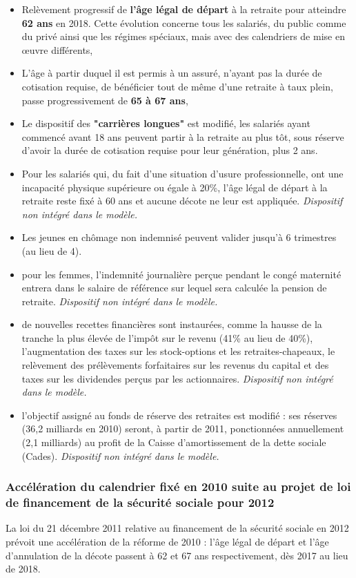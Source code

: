 \begin{itemize}
	\item  Relèvement progressif de \textbf{l'âge légal de départ} à 
la retraite pour atteindre \textbf{62 ans} en 2018. Cette évolution 
concerne tous les salariés, du public comme du privé ainsi 
que les régimes spéciaux, mais avec des calendriers de mise 
en œuvre différents,
	\item   L'âge à partir duquel il est permis à un assuré, 
n'ayant pas la durée de cotisation requise, de bénéficier 
tout de même d'une retraite à taux plein, passe 
progressivement de \textbf{65 à 67 ans},
	\item   Le dispositif des \textbf{"carrières longues"} est modifié, 
les salariés ayant commencé avant 18 ans peuvent partir à la 
retraite au plus tôt, sous réserve d'avoir la durée de 
cotisation requise pour leur génération, plus 2 ans.
	\item   Pour les salariés qui, du fait d'une situation 
d'usure professionnelle, ont une incapacité physique 
supérieure ou égale à 20\%, l'âge légal de départ à la 
retraite reste fixé à 60 ans et aucune décote ne leur est 
appliquée. \textit{Dispositif non intégré dans le modèle.}
	\item   Les jeunes en chômage non indemnisé peuvent 
valider jusqu'à 6 trimestres (au lieu de 4).
	 \item    pour les femmes, l'indemnité journalière perçue 
 pendant le congé maternité entrera dans le salaire de 
 référence sur lequel sera calculée la pension de retraite. \textit{Dispositif non intégré dans le modèle.}
	 \item    de nouvelles recettes financières sont instaurées, 
 comme la hausse de la tranche la plus élevée de l'impôt sur 
 le revenu (41\% au lieu de 40\%), l'augmentation des 
 taxes sur les stock-options et les retraites-chapeaux, le 
 relèvement des prélèvements forfaitaires sur les revenus du 
 capital et des taxes sur les dividendes perçus par les 
 actionnaires. \textit{Dispositif non intégré dans le modèle.}
	 \item    l'objectif assigné au fonds de réserve des 
 retraites est modifié : ses réserves (36,2 milliards en 2010)
  seront, à partir de 2011, ponctionnées annuellement (2,1 
 milliards) au profit de la Caisse d'amortissement de la 
 dette sociale (Cades). \textit{Dispositif non intégré dans le modèle.}
\end{itemize}

\subsubsection{Accélération du calendrier fixé en 2010 suite au projet de loi de financement de la sécurité sociale pour 2012}
La loi du 21 décembre 2011 relative au financement de la sécurité sociale en 2012 prévoit une accélération de la réforme de 2010 : l'âge légal de départ et l'âge d'annulation de la décote passent à 62 et 67 ans respectivement, dès 2017 au lieu de 2018.

